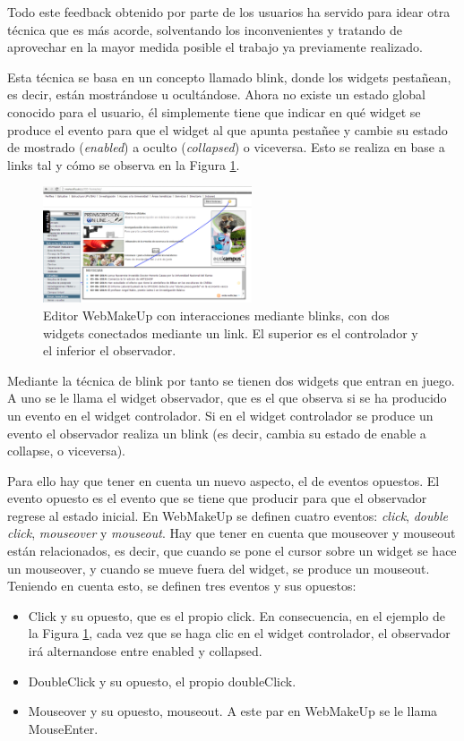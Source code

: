 Todo este feedback obtenido por parte de los usuarios ha servido para idear otra técnica que es más acorde, solventando los inconvenientes y tratando de aprovechar en la mayor medida posible el trabajo ya previamente realizado.

Esta técnica se basa en un concepto llamado blink, donde los widgets pestañean, es decir, están mostrándose u ocultándose. Ahora no existe un estado global conocido para el usuario, él simplemente tiene que indicar en qué widget se produce el evento para que el widget al que apunta pestañee y cambie su estado de mostrado (\emph{enabled}) a oculto (\emph{collapsed}) o viceversa. Esto se realiza en base a links tal y cómo se observa en la Figura \ref{fig:BlinkLink}.

\begin{figure}
\begin{center}
\includegraphics[width=0.55\textwidth]{figs/4-BlinkLink.png}
\caption[WebMakeUp con interacciones mediante el modelo de blinks.]{Editor WebMakeUp con interacciones mediante blinks, con dos widgets conectados mediante un link. El superior es el controlador y el inferior el observador.}
\label{fig:BlinkLink}
\end{center}
\end{figure}

Mediante la técnica de blink por tanto se tienen dos widgets que entran en juego. A uno se le llama el widget observador, que es el que observa si se ha producido un evento en el widget controlador. Si en el widget controlador se produce un evento el observador realiza un blink (es decir, cambia su estado de enable a collapse, o viceversa).

Para ello hay que tener en cuenta un nuevo aspecto, el de eventos opuestos. El evento opuesto es el evento que se tiene que producir para que el observador regrese al estado inicial. En WebMakeUp se definen cuatro eventos: \emph{click}, \emph{double click}, \emph{mouseover} y \emph{mouseout}. Hay que tener en cuenta que mouseover y mouseout están relacionados, es decir, que cuando se pone el cursor sobre un widget se hace un mouseover, y cuando se mueve fuera del widget, se produce un mouseout. Teniendo en cuenta esto, se definen tres eventos y sus opuestos:
\begin{itemize}
\item{Click y su opuesto, que es el propio click. En consecuencia, en el ejemplo de la Figura \ref{fig:BlinkLink}, cada vez que se haga clic en el widget controlador, el observador irá alternandose entre enabled y collapsed.}
\item{DoubleClick y su opuesto, el propio doubleClick.}
\item{Mouseover y su opuesto, mouseout. A este par en WebMakeUp se le llama MouseEnter.}
\end{itemize}

